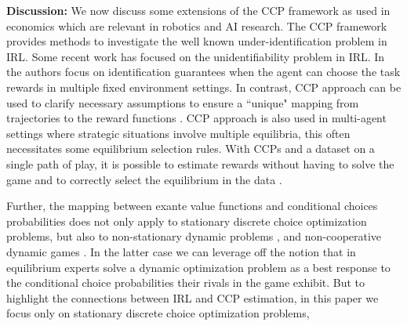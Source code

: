 \documentclass{article}
\begin{document}

\textbf{Discussion:} 
We now discuss some extensions of the CCP framework as used in economics which are relevant in robotics and AI research.  
The CCP framework provides methods to investigate the well known under-identification problem in IRL. Some recent work \cite{amin2017repeated} has focused on the unidentifiability problem in IRL. In \cite{amin2017repeated} the authors focus on identification guarantees when the agent can choose the task rewards in multiple fixed environment settings. In contrast, CCP approach can be used to clarify necessary assumptions to ensure a ``unique" mapping from trajectories to the reward functions \cite{magnac}. CCP approach is also used in multi-agent settings where strategic situations involve multiple equilibria, this often necessitates some equilibrium selection rules. With CCPs and a dataset on a single path of play, it is possible to estimate rewards without having to solve the game and to correctly select the equilibrium in the data \cite{pese}.

Further, the mapping between exante value functions and conditional choices probabilities does not only apply to stationary discrete choice optimization problems, but also to non-stationary dynamic problems \cite{arcidiacono2014nonstationary}, and non-cooperative dynamic games \cite{bajari}. In the latter case we can leverage off the notion that in equilibrium experts solve a dynamic optimization problem as a best response to the conditional choice probabilities their rivals in the game exhibit. But to highlight the connections between IRL and CCP estimation, in this paper we focus only on stationary discrete choice optimization problems,

\end{document}
